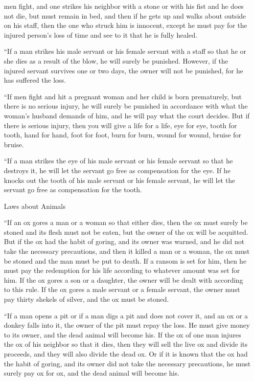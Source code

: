 {men
fight,
and one
strikes
his neighbor
with a stone
or
with his fist
and he does not
die,
but must remain
in bed,
and then if
he gets up
and walks
about outside
on
his staff,
then the one who struck
him is innocent,
except
he must pay for the injured person’s loss of time
and see to it that he is fully healed.
\par }{\PP {}“If
a man strikes
his male servant
or
his female servant
with a staff
so that he or she dies
as
a result
of the blow, he will surely
be punished.
However,
if
the injured servant survives
one or
two days,
the owner
will not
be punished,
for he has suffered the loss.
\par }{\PP {}“If
men
fight
and hit
a pregnant
woman
and her child
is born prematurely,
but there is no
serious injury,
he will
surely be
punished
in accordance with what the
woman’s
husband
demands
of him, and he will
pay what the court decides.
But if
there is serious injury,
then you will give
a life
for
a life,
eye
for
eye,
tooth
for
tooth,
hand
for
hand,
foot
for
foot,
burn
for
burn,
wound
for
wound,
bruise
for
bruise.
\par }{\PP {}“If
a man
strikes
the
eye
of his male servant
or
his female servant
so that he destroys
it, he will let the servant go free
as compensation
for the eye.
If
he knocks out
the tooth
of his male servant
or
his female servant,
he will let the servant go free
as
compensation
for the tooth.
\par }{\SH Laws about Animals
\par }{\PP {}“If
an ox
gores
a man
or
a woman
so
that either dies,
then the ox
must surely be stoned
and its flesh
must not
be eaten,
but the owner
of the ox
will be acquitted.
But if
the ox
had the habit
of goring,
and its owner
was warned,
and he did not
take the necessary precautions,
and then it killed
a man
or
a woman,
the ox
must be stoned
and the man
must
be put to death.
If
a ransom
is set
for him,
then he must pay
the redemption
for his life
according to whatever
amount
was set
for him.
If
the ox gores
a son
or
a daughter,
the owner will be dealt with according
to this rule.
If
the ox
gores
a male servant
or
a female servant,
the owner
must pay
thirty
shekels
of silver,
and the ox
must be stoned.
\par }{\PP {}“If
a man
opens
a pit
or
if
a man
digs
a pit
and does not
cover
it, and an ox
or
a donkey
falls into it,
the owner
of the pit
must repay
the loss. He must give money
to its owner,
and the dead
animal will become his.
If
the ox
of one man
injures
the ox
of his neighbor
so that it dies,
then they will sell
the
live
ox
and divide
its proceeds, and they will also
divide
the dead ox.
Or
if it is known
that
the ox
had the habit
of goring,
and its owner did not
take the necessary
precautions, he must
surely pay
ox
for
ox,
and the dead
animal will become his.


}
